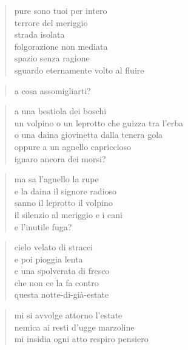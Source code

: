 \begin{verse}
    pure sono tuoi per intero\\
    terrore del meriggio\\
    strada isolata\\
    folgorazione non mediata\\
    spazio senza ragione\\
    sguardo eternamente volto al fluire
\end{verse}

\clearpage


\begin{verse}
    a cosa assomigliarti?
\end{verse}

\begin{verse}
    a una bestiola dei boschi\\
    un volpino o un leprotto che guizza tra l'erba\\
    o una daina giovinetta dalla tenera gola\\
    oppure a un agnello capriccioso\\
    ignaro ancora dei morsi?
\end{verse}

\begin{verse}
    ma sa l'agnello la rupe\\
    e la daina il signore radioso\\
    sanno il leprotto il volpino\\
    il silenzio al meriggio e i cani\\
    e l'inutile fuga?
\end{verse}

\clearpage


\begin{verse}
    cielo velato di stracci\\
    e poi pioggia lenta\\
    e una spolverata di fresco\\
    che non ce la fa contro\\
    questa notte-di-già-estate
\end{verse}

\clearpage


\begin{verse}
    mi si avvolge attorno l'estate\\
    nemica ai resti d'ugge marzoline\\
    mi insidia ogni atto respiro pensiero
\end{verse}

